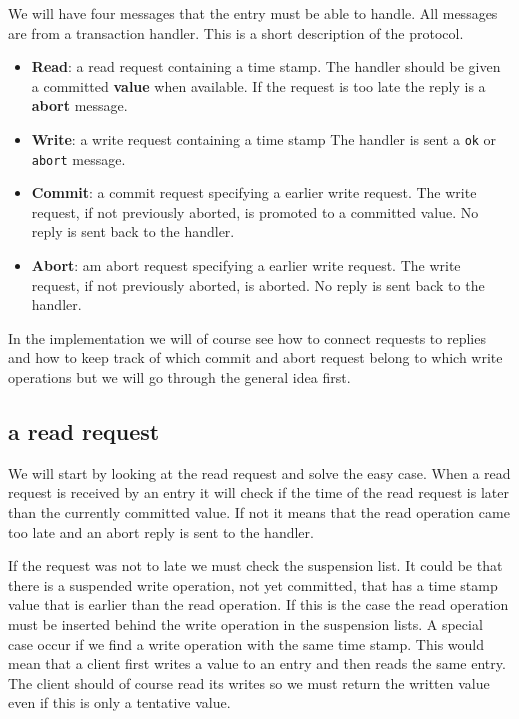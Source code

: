 \documentclass[a4paper, 11pt]{article}
\begin{document}
We will have four messages that the entry must be able to handle. All
messages are from a transaction handler. This is a short description
of the protocol.

\begin{itemize}
\item {\bf Read}: a read request containing a time stamp. The handler
  should be given a committed {\bf value} when available. If the request is
  too late the reply is a {\bf abort} message.
\item {\bf Write}: a write request containing a time stamp The handler
  is sent a {\tt ok} or {\tt abort} message.
\item {\bf Commit}: a commit request specifying a earlier write
  request. The write request, if not previously aborted, is promoted to
  a committed value. No reply is sent back to the handler.
\item {\bf Abort}: am abort request specifying a earlier write
  request. The write request, if not previously aborted, is aborted. No
  reply is sent back to the handler.
\end{itemize}

In the implementation we will of course see how to connect requests to
replies and how to keep track of which commit and abort request belong
to which write operations but we will go through the general idea
first.

\subsection{a read request}

We will start by looking at the read request and solve the easy
case. When a read request is received by an entry it will check if the
time of the read request is later than the currently committed
value. If not it means that the read operation came too late and an
abort reply is sent to the handler.

If the request was not to late we must check the suspension list. It
could be that there is a suspended write operation, not yet committed,
that has a time stamp value that is earlier than the read
operation. If this is the case the read operation must be inserted
behind the write operation in the suspension lists. A special case
occur if we find a write operation with the same time stamp. This would
mean that a client first writes a value to an entry and then reads the
same entry. The client should of course read its writes so we must
return the written value even if this is only a tentative value. 
\end{document}
